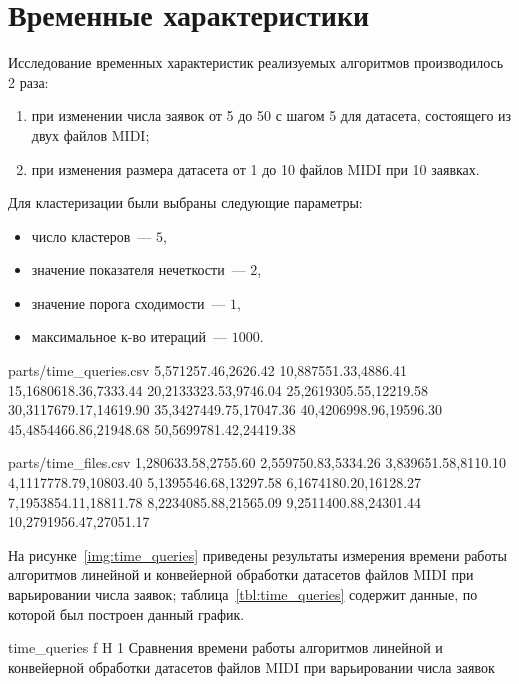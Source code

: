 \section{Временные характеристики}

Исследование временных характеристик реализуемых алгоритмов производилось 2 раза:
\begin{enumerate}
	\item при изменении числа заявок от 5 до 50 с шагом 5 для датасета, состоящего из двух файлов MIDI;
	\item при изменения размера датасета от 1 до 10 файлов MIDI при 10 заявках.
\end{enumerate}

Для кластеризации были выбраны следующие параметры:
\begin{itemize}
	\item число кластеров~--- $5$,
	\item значение показателя нечеткости~--- $2$,
	\item значение порога сходимости~--- $1$,
	\item максимальное к-во итераций~--- $1000$.
\end{itemize}

\begin{filecontents*}{parts/time_queries.csv}
	5,571257.46,2626.42
	10,887551.33,4886.41
	15,1680618.36,7333.44
	20,2133323.53,9746.04
	25,2619305.55,12219.58
	30,3117679.17,14619.90
	35,3427449.75,17047.36
	40,4206998.96,19596.30
	45,4854466.86,21948.68
	50,5699781.42,24419.38
\end{filecontents*}

\begin{filecontents*}{parts/time_files.csv}
	1,280633.58,2755.60
	2,559750.83,5334.26
	3,839651.58,8110.10
	4,1117778.79,10803.40
	5,1395546.68,13297.58
	6,1674180.20,16128.27
	7,1953854.11,18811.78
	8,2234085.88,21565.09
	9,2511400.88,24301.44
	10,2791956.47,27051.17
\end{filecontents*}

На рисунке~\ref{img:time_queries} приведены результаты измерения времени работы алгоритмов линейной и конвейерной обработки датасетов файлов MIDI при варьировании числа заявок; таблица~\ref{tbl:time_queries} содержит данные, по которой был построен данный график.

	{time_queries}
	{f}
	{H}
	{1\textwidth}
	{Сравнения времени работы алгоритмов линейной и конвейерной обработки датасетов файлов MIDI при варьировании числа заявок}
	
